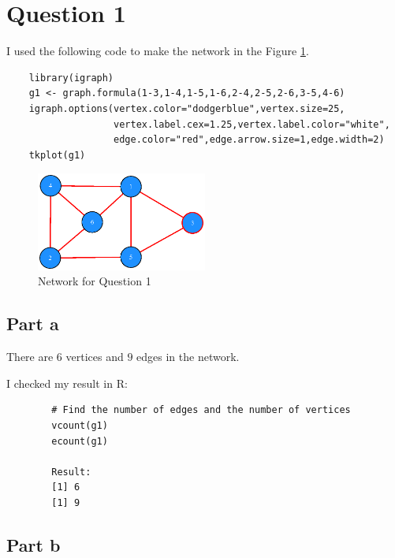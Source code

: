 \section{Question 1}

I used the following code to make the network in the Figure \ref{fig:fig1}.

\begin{verbatim}
    library(igraph)
    g1 <- graph.formula(1-3,1-4,1-5,1-6,2-4,2-5,2-6,3-5,4-6)
    igraph.options(vertex.color="dodgerblue",vertex.size=25,
                   vertex.label.cex=1.25,vertex.label.color="white",
                   edge.color="red",edge.arrow.size=1,edge.width=2)
    tkplot(g1)
\end{verbatim}

\begin{figure}[H]
        \centering
        \includegraphics[width=0.5\textwidth]{Figure1.eps}
        \caption{\label{fig:fig1}Network for Question 1}
\end{figure}

\subsection{Part a}

\begin{answer}
    There are $6$ vertices and $9$ edges in the network.
    
    I checked my result in R:
    \begin{verbatim}
        # Find the number of edges and the number of vertices
        vcount(g1)
        ecount(g1)
        
        Result:
        [1] 6
        [1] 9
    \end{verbatim}
\end{answer}

\subsection{Part b}

